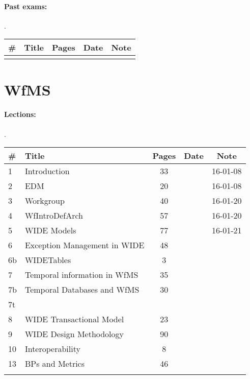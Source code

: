 \documentclass[a4paper,12pt]{article} %
\begin{document}
\paragraph{Past exams:}.\\
\begin{tabularx}{\textwidth}{|l|X|c|l|c|}
	\hline
	\# & Title & Pages & Date & Note \\
	\hline
	&  &  &  &  \\
	\hline
\end{tabularx}

\newpage
\section{WfMS}
\paragraph{Lections:}.\\
\begin{tabularx}{\textwidth}{|l|X|c|l|c|}
	\hline
	\# & Title & Pages & Date & Note \\
	\hline
	1 & Introduction & 33 &  & 16-01-08 \\
	\hline
	2 & EDM & 20 &  & 16-01-08 \\
	\hline
	3 & Workgroup & 40 &  & 16-01-20 \\
	\hline
	4 & WfIntroDefArch & 57 &  & 16-01-20 \\
	\hline
	5 & WIDE Models & 77 &  & 16-01-21 \\
	\hline
	6 & Exception Management in WIDE & 48 &  &  \\
	\hline
	6b & WIDETables & 3 &  &  \\
	\hline
	7 & Temporal information in WfMS & 35 &  &  \\
	\hline
	7b & Temporal Databases and WfMS & 30 &  &  \\
	\hline
	7t &  &  &  &  \\
	\hline
	8 & WIDE Transactional Model & 23 &  &  \\
	\hline
	9 & WIDE Design Methodology & 90 &  &  \\
	\hline
	10 & Interoperability & 8 &  &  \\
	\hline
	13 & BPs and Metrics & 46 &  &  \\
	\hline
	&  &  &  &  \\
	\hline
\end{tabularx}
\end{document}
